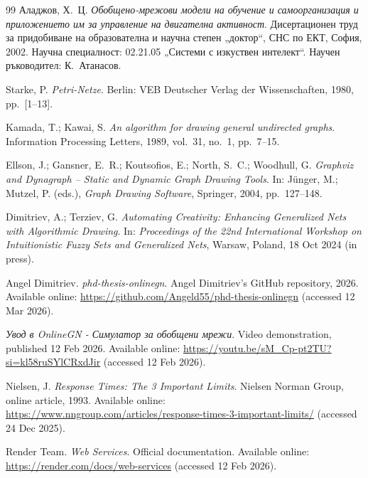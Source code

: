 \begin{thebibliography}{99}
Аладжов, Х.~Ц.
\newblock \emph{Обобщено-мрежови модели на обучение и самоорганизация и приложението им за управление на двигателна активност}.
\newblock Дисертационен труд за придобиване на образователна и научна степен „доктор“,
СНС по ЕКТ, София, 2002.
\newblock Научна специалност: 02.21.05 „Системи с изкуствен интелект“.
\newblock Научен ръководител: К.~Атанасов.

Starke, P.
\newblock \emph{Petri-Netze}.
\newblock Berlin: VEB Deutscher Verlag der Wissenschaften, 1980, pp.~[1--13].

Kamada, T.; Kawai, S.
\newblock \emph{An algorithm for drawing general undirected graphs}.
\newblock Information Processing Letters, 1989, vol.~31, no.~1, pp.~7--15.

Ellson, J.; Gansner, E.~R.; Koutsofios, E.; North, S.~C.; Woodhull, G.
\newblock \emph{Graphviz and Dynagraph -- Static and Dynamic Graph Drawing Tools}.
\newblock In: J{\"u}nger, M.; Mutzel, P. (eds.), \emph{Graph Drawing Software}, Springer, 2004, pp.~127--148.

Dimitriev, A.; Terziev, G.
\newblock \emph{Automating Creativity: Enhancing Generalized Nets with Algorithmic Drawing}.
\newblock In: \emph{Proceedings of the 22nd International Workshop on Intuitionistic Fuzzy Sets and Generalized Nets},
Warsaw, Poland, 18 Oct 2024 (in press).

Angel Dimitriev.
\newblock \emph{phd-thesis-onlinegn}.
\newblock Angel Dimitriev's GitHub repository, 2026.
\newblock Available online: \url{https://github.com/Angeld55/phd-thesis-onlinegn} (accessed 12 Mar 2026).

\newblock \emph{Увод в OnlineGN - Симулатор за обобщени мрежи}.
\newblock Video demonstration, published 12 Feb 2026.
\newblock Available online: \url{https://youtu.be/sM_Cp-pt2TU?si=kl58ruSYlCRxdJir} (accessed 12 Feb 2026).

Nielsen, J.
\newblock \emph{Response Times: The 3 Important Limits}.
\newblock Nielsen Norman Group, online article, 1993.
\newblock Available online: \url{https://www.nngroup.com/articles/response-times-3-important-limits/} (accessed 24 Dec 2025).

 Render Team.
\newblock \emph{Web Services}.
\newblock Official documentation.
\newblock Available online: \url{https://render.com/docs/web-services} (accessed 12 Feb 2026).


\end{thebibliography}
